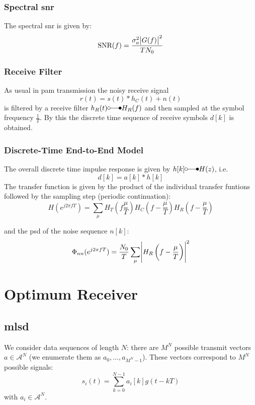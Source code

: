 \subsubsection{Spectral \acl{snr}}
The spectral \ac{snr} is given by:
\begin{equation}
    \text{SNR}(f) = \frac{\sigma_a^2 \abs{G(f)}^2}{T N_0}
\end{equation}

\subsubsection{Receive Filter}
As usual in \ac{pam} transmission the noisy receive signal
\begin{equation}
    r(t) = s(t) * h_C(t) + n(t)
\end{equation}
is filtered by a receive filter $h_R(t) \laplace H_R(f)$ and then sampled at the symbol
frequency $\frac{1}{T}$. By this the discrete time sequence of receive symbols $d[k]$
is obtained.

\subsubsection{Discrete-Time End-to-End Model}
The overall discrete time impulse response is given by $h[k] \laplace H(z)$, i.e.
\begin{equation}
    d[k] = a[k] * h[k]
\end{equation}
The transfer function is given by the product of the individual transfer funtions
followed by the sampling step (periodic continuation):
\begin{equation}
    H(e^{j 2 \pi f T}) = \sum_\mu H_T\left(f \frac{\mu}{T}\right) 
        H_C\left(f - \frac{\mu}{T}\right)
        H_R\left(f - \frac{\mu}{T}\right)
\end{equation}

and the \ac{psd} of the noise sequence $n[k]$:
\begin{equation}
    \Phi_{nn}(e^{j 2 \pi f T}) = \frac{N_0}{T} \sum_\mu \abs{H_R\left(f - \frac{\mu}{T}\right)}^2
\end{equation}

\section{Optimum Receiver}
\subsection{\acl{mlsd}}
We consider data sequences of length $N$: there are $M^N$ possible transmit vectors
$a \in \mathcal{A}^N$ (we enumerate them as $a_0, \ldots, a_{M^N-1}$). These
vectors correspond to $M^N$ possible signals:
\begin{equation}
    s_i(t) = \sum_{k=0}^{N-1} a_i[k] g(t-kT)
\end{equation}
with $a_i \in \mathcal{A}^N$.


